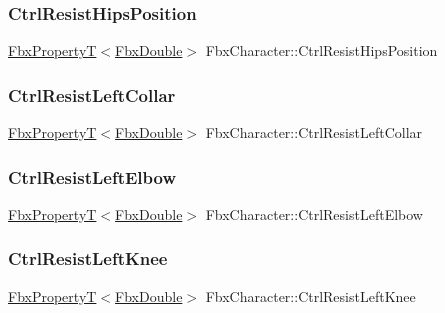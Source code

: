 \subsubsection{\texorpdfstring{Ctrl\+Resist\+Hips\+Position}{CtrlResistHipsPosition}}
{\footnotesize\ttfamily \hyperlink{class_fbx_property_t}{Fbx\+PropertyT}$<$\hyperlink{fbxtypes_8h_a171e72a1c46fc15c1a6c9c31948c1c5b}{Fbx\+Double}$>$ Fbx\+Character\+::\+Ctrl\+Resist\+Hips\+Position}

\mbox{\label{class_fbx_character_a1fb34d9229828d20770e3cc633bb1c55}} 
\subsubsection{\texorpdfstring{Ctrl\+Resist\+Left\+Collar}{CtrlResistLeftCollar}}
{\footnotesize\ttfamily \hyperlink{class_fbx_property_t}{Fbx\+PropertyT}$<$\hyperlink{fbxtypes_8h_a171e72a1c46fc15c1a6c9c31948c1c5b}{Fbx\+Double}$>$ Fbx\+Character\+::\+Ctrl\+Resist\+Left\+Collar}

\mbox{\label{class_fbx_character_a458ef1c6f23727b7bc6e7c5458cc5cfd}} 
\subsubsection{\texorpdfstring{Ctrl\+Resist\+Left\+Elbow}{CtrlResistLeftElbow}}
{\footnotesize\ttfamily \hyperlink{class_fbx_property_t}{Fbx\+PropertyT}$<$\hyperlink{fbxtypes_8h_a171e72a1c46fc15c1a6c9c31948c1c5b}{Fbx\+Double}$>$ Fbx\+Character\+::\+Ctrl\+Resist\+Left\+Elbow}

\mbox{\label{class_fbx_character_afc99c4b02f770e151d137bbba9072a66}} 
\subsubsection{\texorpdfstring{Ctrl\+Resist\+Left\+Knee}{CtrlResistLeftKnee}}
{\footnotesize\ttfamily \hyperlink{class_fbx_property_t}{Fbx\+PropertyT}$<$\hyperlink{fbxtypes_8h_a171e72a1c46fc15c1a6c9c31948c1c5b}{Fbx\+Double}$>$ Fbx\+Character\+::\+Ctrl\+Resist\+Left\+Knee}

